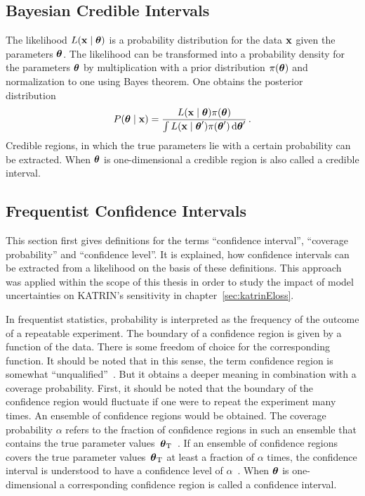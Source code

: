 \subsection{Bayesian Credible Intervals}
\label{sec:statMethodsUncertaintyIntervalsCredible}
The likelihood $L\giventhat{\dataVec}{\paramVec}$ is a probability distribution for the data $\boldsymbol{\mathbf{x}}$ given the parameters $\boldsymbol{\mathbf{\theta}}$. The likelihood can be transformed into a probability density for the parameters $\boldsymbol{\mathbf{\theta}}$ by multiplication with a prior distribution $\pi(\boldsymbol{\mathbf{\theta}})$ and normalization to one using Bayes theorem. One obtains the posterior distribution~\cite{ReviewOfParticlePhysics}
\begin{equation}
\label{eq:statMethodsPosterior}
	P\giventhat{\paramVec}{\dataVec} = 
		\frac{
			L\giventhat{\dataVec}{\paramVec}\pi(\paramVec)
		}{
			\int L\giventhat{\dataVec}{\paramVec^\prime}\pi(\paramVec^\prime) \d\paramVec^\prime
		}
	\fullstop
\end{equation}
Credible regions, in which the true parameters lie with a certain probability can be extracted. When $\boldsymbol{\mathbf{\theta}}$ is one-dimensional a credible region is also called a credible interval. 

\subsection{Frequentist Confidence Intervals}
\label{sec:statMethodsUncertaintyIntervalsConfidence}
This section first gives definitions for the terms ``confidence interval'', ``coverage probability'' and ``confidence level''. It is explained, how confidence intervals can be extracted from a likelihood on the basis of these definitions. This approach was applied within the scope of this thesis in order to study the impact of model uncertainties on KATRIN's sensitivity in chapter~\ref{sec:katrinEloss}.

In frequentist statistics, probability is interpreted as the frequency of the outcome of a repeatable experiment. The boundary of a confidence region is given by a function of the data. There is some freedom of choice for the corresponding function. It should be noted that in this sense, the term confidence region is somewhat ``unqualified''~\cite{ReviewOfParticlePhysics}. But it obtains a deeper meaning in combination with a coverage probability. First, it should be noted that the boundary of the confidence region would fluctuate if one were to repeat the experiment many times. An ensemble of confidence regions would be obtained. The coverage probability $\alpha$ refers to the fraction of confidence regions in such an ensemble that contains the true parameter values~$\boldsymbol{\mathbf{\theta}}_\mathrm{T}$~\cite{ReviewOfParticlePhysics}. If an ensemble of confidence regions covers the true parameter values~$\boldsymbol{\mathbf{\theta}}_\mathrm{T}$ at least a fraction of $\alpha$ times, the confidence interval is understood to have a confidence level of $\alpha$~\cite{ReviewOfParticlePhysics}. When $\boldsymbol{\mathbf{\theta}}$ is one-dimensional a corresponding confidence region is called a confidence interval. 


